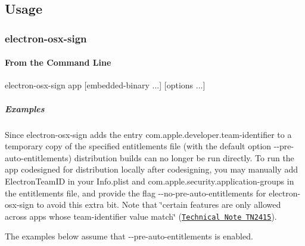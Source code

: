 \subsection*{Usage}

\subsubsection*{electron-\/osx-\/sign}

\paragraph*{From the Command Line}


\begin{DoxyCode}
electron-osx-sign app [embedded-binary ...] [options ...]
\end{DoxyCode}


\subparagraph*{Examples}

Since {\ttfamily electron-\/osx-\/sign} adds the entry {\ttfamily com.\+apple.\+developer.\+team-\/identifier} to a temporary copy of the specified entitlements file (with the default option {\ttfamily -\/-\/pre-\/auto-\/entitlements}) distribution builds can no longer be run directly. To run the app codesigned for distribution locally after codesigning, you may manually add {\ttfamily Electron\+Team\+ID} in your {\ttfamily Info.\+plist} and {\ttfamily com.\+apple.\+security.\+application-\/groups} in the entitlements file, and provide the flag {\ttfamily -\/-\/no-\/pre-\/auto-\/entitlements} for {\ttfamily electron-\/osx-\/sign} to avoid this extra bit. Note that \char`\"{}certain features are only allowed across apps whose team-\/identifier value match\char`\"{} (\href{https://developer.apple.com/library/content/technotes/tn2415/_index.html#//apple_ref/doc/uid/DTS40016427-CH1-ENTITLEMENTSLIST}{\tt Technical Note T\+N2415}).

The examples below assume that {\ttfamily -\/-\/pre-\/auto-\/entitlements} is enabled.


